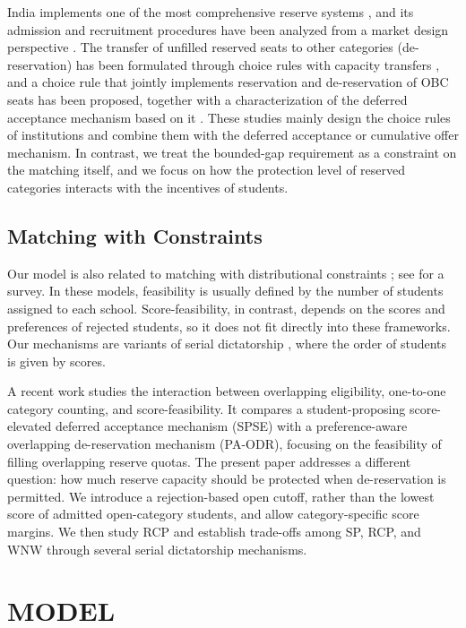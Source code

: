 \documentclass[a4paper,twoside]{article}
\theoremstyle{definition}
\begin{document}
India implements one of the most comprehensive reserve systems
\cite{Gala84a,SoYe22a}, and its admission and recruitment procedures have been analyzed from a
market design perspective \cite{AyTu17a,BCC+19b,SoYe22a}.
The transfer of unfilled reserved seats to other categories (de-reservation) has been
formulated through choice rules with capacity transfers \cite{AyTu20a}, and a choice rule
that jointly implements reservation and de-reservation of OBC seats has been proposed,
together with a characterization of the deferred acceptance mechanism based on it
\cite{AyTu23a}.
These studies mainly design the choice rules of institutions and combine them with the
deferred acceptance or cumulative offer mechanism.
In contrast, we treat the bounded-gap requirement as a constraint on the matching
itself, and we focus on how the protection level of reserved categories interacts with
the incentives of students.

\subsection{Matching with Constraints}

Our model is also related to matching with distributional constraints
\cite{KaKo15a,GKK+17a,KTY18a}; see \cite{ABY22a} for a survey.
In these models, feasibility is usually defined by the number of students assigned to
each school. Score-feasibility, in contrast, depends on the scores and preferences of
rejected students, so it does not fit directly into these frameworks.
Our mechanisms are variants of serial dictatorship \cite{Sven99a,AbSo98a,GKK+17a}, where the order of
students is given by scores.

A recent work \cite{SZZ26} studies the interaction between overlapping eligibility, one-to-one category counting, and score-feasibility.  
It compares a student-proposing score-elevated deferred acceptance
mechanism (SPSE) with a preference-aware overlapping de-reservation
mechanism (PA-ODR), focusing on the
feasibility of filling overlapping reserve quotas.
The present paper addresses a different question:
how much reserve capacity should be protected when
de-reservation is permitted.
We introduce a rejection-based open cutoff, rather than the
lowest score of admitted open-category students, and allow
category-specific score margins.
We then study RCP and establish
trade-offs among SP, RCP, and WNW through several serial dictatorship mechanisms.

\section{\uppercase{Model}}
\label{sec:model}
\end{document}
